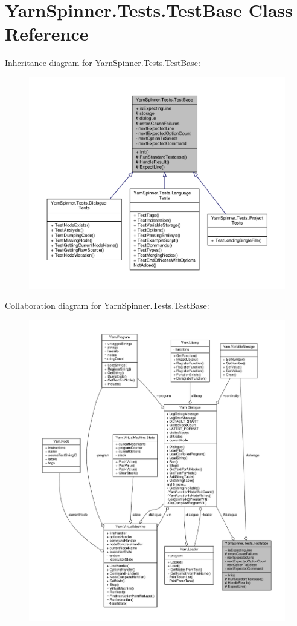 \hypertarget{a00146}{\section{Yarn\-Spinner.\-Tests.\-Test\-Base Class Reference}
\label{a00146}
}


Inheritance diagram for Yarn\-Spinner.\-Tests.\-Test\-Base\-:
\nopagebreak
\begin{figure}[H]
\begin{center}
\leavevmode
\includegraphics[width=350pt]{da/da3/a00741}
\end{center}
\end{figure}


Collaboration diagram for Yarn\-Spinner.\-Tests.\-Test\-Base\-:
\nopagebreak
\begin{figure}[H]
\begin{center}
\leavevmode
\includegraphics[width=350pt]{d4/d8f/a00742}
\end{center}
\end{figure}

